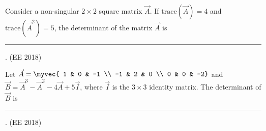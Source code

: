     \item Consider a non-singular $2 \times 2$ square matrix $\vec{A}$. If $\text{trace}(\vec{A}) = 4$ and $\text{trace}(\vec{A}^{2}) = 5$, the determinant of the matrix $\vec{A}$ is \rule{1cm}{0.01pt}.
    \hfill{(EE 2018)}
\item Let $\vec{A} = 
	\myvec{
1 & 0 & -1 \\
-1 & 2 & 0 \\
0 & 0 & -2}$
 and $\vec{B} = \vec{A}^3 - \vec{A}^2 - 4\vec{A} + 5\vec{I}$, where $\vec{I}$ is the $3 \times 3$ identity matrix. The determinant of $\vec{B}$ is \rule{1cm}{0.01pt}.
 \hfill{(EE 2018)}

